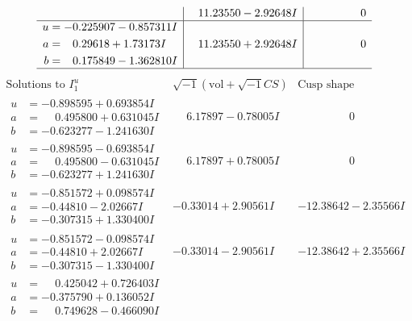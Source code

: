 \documentclass[1p]{elsarticle_modified}
\theoremstyle{definition}
\newcommand{\I}{\sqrt{-1}}
\begin{document}
$$\begin{array}{c|c|c}
 & \phantom{-}11.23550 - 2.92648 I & \phantom{-0.000000 } 0 \\ \hline\begin{aligned}
u &= -0.225907 - 0.857311 I \\
a &= \phantom{-}0.29618 + 1.73173 I \\
b &= \phantom{-}0.175849 - 1.362810 I\end{aligned}
 & \phantom{-}11.23550 + 2.92648 I & \phantom{-0.000000 } 0\\
 \hline 
 \end{array}$$\newpage$$\begin{array}{c|c|c}  
\text{Solutions to }I^u_{1}& \I (\text{vol} + \sqrt{-1}CS) & \text{Cusp shape}\\
 \hline 
\begin{aligned}
u &= -0.898595 + 0.693854 I \\
a &= \phantom{-}0.495800 + 0.631045 I \\
b &= -0.623277 - 1.241630 I\end{aligned}
 & \phantom{-}6.17897 - 0.78005 I & \phantom{-0.000000 } 0 \\ \hline\begin{aligned}
u &= -0.898595 - 0.693854 I \\
a &= \phantom{-}0.495800 - 0.631045 I \\
b &= -0.623277 + 1.241630 I\end{aligned}
 & \phantom{-}6.17897 + 0.78005 I & \phantom{-0.000000 } 0 \\ \hline\begin{aligned}
u &= -0.851572 + 0.098574 I \\
a &= -0.44810 - 2.02667 I \\
b &= -0.307315 + 1.330400 I\end{aligned}
 & -0.33014 + 2.90561 I & -12.38642 - 2.35566 I \\ \hline\begin{aligned}
u &= -0.851572 - 0.098574 I \\
a &= -0.44810 + 2.02667 I \\
b &= -0.307315 - 1.330400 I\end{aligned}
 & -0.33014 - 2.90561 I & -12.38642 + 2.35566 I \\ \hline\begin{aligned}
u &= \phantom{-}0.425042 + 0.726403 I \\
a &= -0.375790 + 0.136052 I \\
b &= \phantom{-}0.749628 - 0.466090 I\end{aligned}

\end{array}$$
\end{document}
